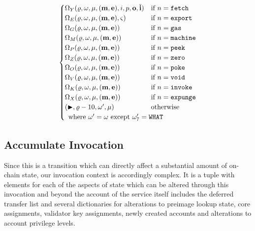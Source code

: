 \begin{align}
\begin{cases}
      \Omega_Y(\gascounter, \registers, \memory, (\mathbf{m}, \mathbf{e}), i, p, \mathbf{o}, \overline{\mathbf{i}}) &\when n = \mathtt{fetch}\\
      \Omega_E(\gascounter, \registers, \memory, (\mathbf{m}, \mathbf{e}), \segoff) &\when n = \mathtt{export}\\
      \Omega_G(\gascounter, \registers, \memory, (\mathbf{m}, \mathbf{e})) &\when n = \mathtt{gas}\\
      \Omega_M(\gascounter, \registers, \memory, (\mathbf{m}, \mathbf{e})) &\when n = \mathtt{machine}\\
      \Omega_P(\gascounter, \registers, \memory, (\mathbf{m}, \mathbf{e})) &\when n = \mathtt{peek}\\
      \Omega_Z(\gascounter, \registers, \memory, (\mathbf{m}, \mathbf{e})) &\when n = \mathtt{zero}\\
      \Omega_O(\gascounter, \registers, \memory, (\mathbf{m}, \mathbf{e})) &\when n = \mathtt{poke}\\
      \Omega_V(\gascounter, \registers, \memory, (\mathbf{m}, \mathbf{e})) &\when n = \mathtt{void}\\
      \Omega_K(\gascounter, \registers, \memory, (\mathbf{m}, \mathbf{e})) &\when n = \mathtt{invoke}\\
      \Omega_X(\gascounter, \registers, \memory, (\mathbf{m}, \mathbf{e})) &\when n = \mathtt{expunge}\\
      (\continue, \gascounter - 10, \registers', \memory) &\otherwise\\
      \multicolumn{2}{l}{\where \registers' = \registers \exc \registers'_7 = \mathtt{WHAT}}
    \end{cases}
\end{align}

\subsection{Accumulate Invocation}\label{sec:accumulateinvocation}

Since this is a transition which can directly affect a substantial amount of on-chain state, our invocation context is accordingly complex. It is a tuple with elements for each of the aspects of state which can be altered through this invocation and beyond the account of the service itself includes the deferred transfer list and several dictionaries for alterations to preimage lookup state, core assignments, validator key assignments, newly created accounts and alterations to account privilege levels.

